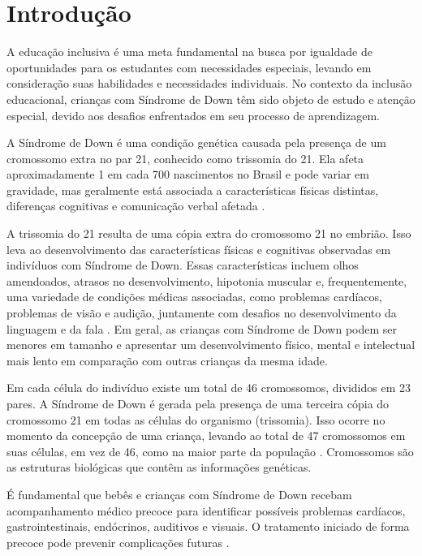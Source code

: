 \chapter{Introdução}\label{chp:intro}
A educação inclusiva é uma meta fundamental na busca por igualdade de oportunidades para os estudantes com necessidades especiais, levando em consideração suas habilidades e necessidades individuais. No contexto da inclusão educacional, crianças com Síndrome de Down têm sido objeto de estudo e atenção especial, devido aos desafios enfrentados em seu processo de aprendizagem.

A Síndrome de Down é uma condição genética causada pela presença de um cromossomo extra no par 21, conhecido como trissomia do 21. Ela afeta aproximadamente 1 em cada 700 nascimentos no Brasil e pode variar em gravidade, mas geralmente está associada a características físicas distintas, diferenças cognitivas e comunicação verbal afetada \cite{mariahelenavarellabruna2011}. 

A trissomia do 21 resulta de uma cópia extra do cromossomo 21 no embrião. Isso leva ao desenvolvimento das características físicas e cognitivas observadas em indivíduos com Síndrome de Down. Essas características incluem olhos amendoados, atrasos no desenvolvimento, hipotonia muscular e, frequentemente, uma variedade de condições médicas associadas, como problemas cardíacos, problemas de visão e audição, juntamente com desafios no desenvolvimento da linguagem e da fala \cite{mariahelenavarellabruna2011}. Em geral, as crianças com Síndrome de Down podem ser menores em tamanho e apresentar um desenvolvimento físico, mental e intelectual mais lento em comparação com outras crianças da mesma idade.

Em cada célula do indivíduo existe um total de 46 cromossomos, divididos em 23 pares. A Síndrome de Down é gerada pela presença de uma terceira cópia do cromossomo 21 em todas as células do organismo (trissomia). Isso ocorre no momento da concepção de uma criança, levando ao total de 47 cromossomos em suas células, em vez de 46, como na maior parte da população \cite{mariahelenavarellabruna2011}. Cromossomos são as estruturas biológicas que contêm as informações genéticas.

É fundamental que bebês e crianças com Síndrome de Down recebam acompanhamento médico precoce para identificar possíveis problemas cardíacos, gastrointestinais, endócrinos, auditivos e visuais. O tratamento iniciado de forma precoce pode prevenir complicações futuras \cite{mariahelenavarellabruna2011}.

